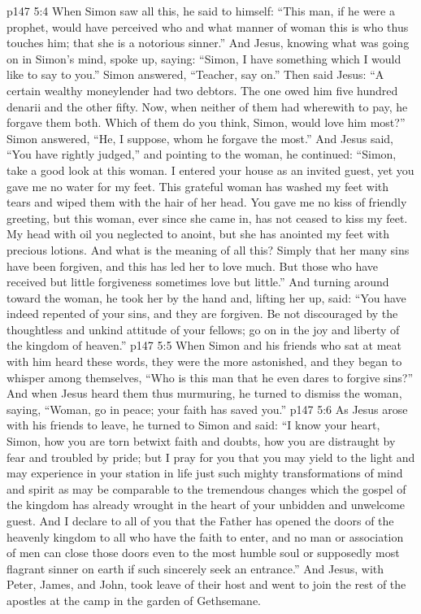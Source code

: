 \vs p147 5:4 When Simon saw all this, he said to himself: “This man, if he were a prophet, would have perceived who and what manner of woman this is who thus touches him; that she is a notorious sinner.” And Jesus, knowing what was going on in Simon’s mind, spoke up, saying: \textcolor{ubdarkred}{“Simon, I have something which I would like to say to you.”} Simon answered, “Teacher, say on.” Then said Jesus: \textcolor{ubdarkred}{“A certain wealthy moneylender had two debtors. The one owed him five hundred denarii and the other fifty. Now, when neither of them had wherewith to pay, he forgave them both. Which of them do you think, Simon, would love him most?”} Simon answered, “He, I suppose, whom he forgave the most.” And Jesus said, \textcolor{ubdarkred}{“You have rightly judged,”} and pointing to the woman, he continued: \textcolor{ubdarkred}{“Simon, take a good look at this woman. I entered your house as an invited guest, yet you gave me no water for my feet. This grateful woman has washed my feet with tears and wiped them with the hair of her head. You gave me no kiss of friendly greeting, but this woman, ever since she came in, has not ceased to kiss my feet. My head with oil you neglected to anoint, but she has anointed my feet with precious lotions. And what is the meaning of all this? Simply that her many sins have been forgiven, and this has led her to love much. But those who have received but little forgiveness sometimes love but little.”} And turning around toward the woman, he took her by the hand and, lifting her up, said: \textcolor{ubdarkred}{“You have indeed repented of your sins, and they are forgiven. Be not discouraged by the thoughtless and unkind attitude of your fellows; go on in the joy and liberty of the kingdom of heaven.”}
\pc \vs p147 5:5 When Simon and his friends who sat at meat with him heard these words, they were the more astonished, and they began to whisper among themselves, “Who is this man that he even dares to forgive sins?” And when Jesus heard them thus murmuring, he turned to dismiss the woman, saying, \textcolor{ubdarkred}{“Woman, go in peace; your faith has saved you.”}
\vs p147 5:6 As Jesus arose with his friends to leave, he turned to Simon and said: \textcolor{ubdarkred}{“I know your heart, Simon, how you are torn betwixt faith and doubts, how you are distraught by fear and troubled by pride; but I pray for you that you may yield to the light and may experience in your station in life just such mighty transformations of mind and spirit as may be comparable to the tremendous changes which the gospel of the kingdom has already wrought in the heart of your unbidden and unwelcome guest. And I declare to all of you that the Father has opened the doors of the heavenly kingdom to all who have the faith to enter, and no man or association of men can close those doors even to the most humble soul or supposedly most flagrant sinner on earth if such sincerely seek an entrance.”} And Jesus, with Peter, James, and John, took leave of their host and went to join the rest of the apostles at the camp in the garden of Gethsemane.

